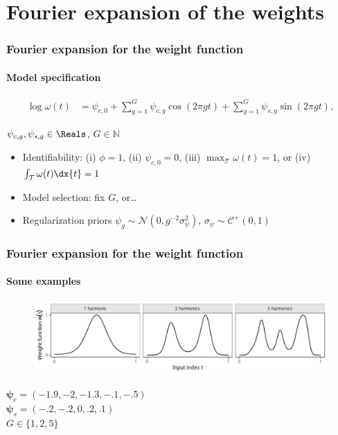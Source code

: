 \documentclass{snedecorbeamer}
\begin{document}
\section{Fourier expansion of the weights}

\begin{frame}
  \frametitle{Fourier expansion for the weight function}
  \framesubtitle{Model specification}

  \begin{align}
  \log\omega(t)
  \label{eq:few-log}
  &=\psi_{c,0} + \sum_{g = 1}^{G} \psi_{c,g}\cos\left(2\pi gt\right)
    + \sum_{g = 1}^{G} \psi_{s,g}\sin\left(2\pi gt\right),
  \end{align}

  \begin{center}
    $\psi_{c,g},\psi_{s,g}\in\Reals$, $G\in\mathbb{N}$
  \end{center}

  \vfill{}

  \begin{itemize}[<+(1)->]
  \item Identifiability: (i) $\phi = 1$, (ii) $\psi_{c,0} = 0$,
    (iii) $\max_\mathcal{T}\omega(t) = 1$, or (iv)
    $\int_\mathcal{T}\omega(t)\dx{t} = 1$
  \item Model selection: fix $G$, or\dots
  \item Regularization priors $\psi_g\sim\mathcal{N}(0,
    g^{-2}\sigma^2_\psi)$, $\sigma_\psi\sim\mathcal{C}^+(0, 1)$
  \end{itemize}

\end{frame}

\begin{frame}
  \frametitle{Fourier expansion for the weight function}
  \framesubtitle{Some examples}

  \begin{figure}
    \centering
    \includegraphics[width=1\textwidth]{syn01-weight-span}
  \end{figure}

  \begin{center}
    $\bm{\psi}_{c} = (-1.9, -2, -1.3, -.1, -.5)$\\
    $\bm{\psi}_{s} = (-.2, -.2, 0, .2, .1)$\\
    $G\in\{1, 2, 5\}$
  \end{center}
\end{frame}
\end{document}
